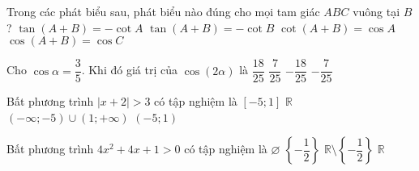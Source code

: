 \begin{ex}%
Trong các phát biểu sau, phát biểu nào đúng cho mọi tam giác $ABC$ vuông tại $B$?
\choice
{\True $\tan(A+B)=-\cot A$}
{$\tan(A+B)=-\cot B$}
{$\cot(A+B)=\cos A$}
{$\cos(A+B)=\cos C$}
\end{ex}

\begin{ex}%
Cho $\cos\alpha =\dfrac{3}{5}$. Khi đó giá trị của $\cos(2\alpha)$ là
\choice
{$\dfrac{18}{25}$}
{$\dfrac{7}{25}$}
{$-\dfrac{18}{25}$}
{\True $-\dfrac{7}{25}$}
\end{ex}

\begin{ex}%
Bất phương trình $\left|x+2\right|>3$ có tập nghiệm là
\choice
{$\left[-5;1\right]$}
{$\mathbb{R}$}
{\True $(-\infty;-5)\cup (1;+\infty)$}
{$\left(-5;1\right)$}
\end{ex}

\begin{ex}%
Bất phương trình $4x^2+4x+1>0$ có tập nghiệm là
\choice
{$\varnothing$}
{$\left\{-\dfrac{1}{2}\right\}$}
{\True $\mathbb{R}\setminus\left\{-\dfrac{1}{2}\right\}$}
{$\mathbb{R}$}
\end{ex}

